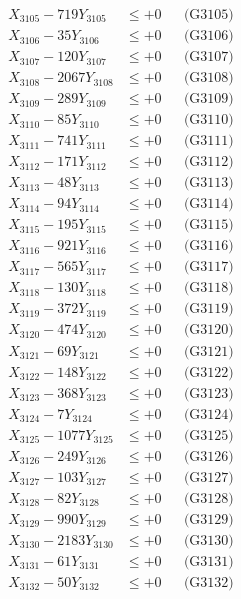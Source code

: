 \documentclass[a4paper,10pt]{article}
\begin{document}
{\begin{align}
X_{3105} - 719Y_{3105} &\leq +0 && \text{(G3105)} \\
X_{3106} - 35Y_{3106} &\leq +0 && \text{(G3106)} \\
X_{3107} - 120Y_{3107} &\leq +0 && \text{(G3107)} \\
X_{3108} - 2067Y_{3108} &\leq +0 && \text{(G3108)} \\
X_{3109} - 289Y_{3109} &\leq +0 && \text{(G3109)} \\
X_{3110} - 85Y_{3110} &\leq +0 && \text{(G3110)} \\
\allowbreak
X_{3111} - 741Y_{3111} &\leq +0 && \text{(G3111)} \\
X_{3112} - 171Y_{3112} &\leq +0 && \text{(G3112)} \\
X_{3113} - 48Y_{3113} &\leq +0 && \text{(G3113)} \\
X_{3114} - 94Y_{3114} &\leq +0 && \text{(G3114)} \\
X_{3115} - 195Y_{3115} &\leq +0 && \text{(G3115)} \\
X_{3116} - 921Y_{3116} &\leq +0 && \text{(G3116)} \\
X_{3117} - 565Y_{3117} &\leq +0 && \text{(G3117)} \\
X_{3118} - 130Y_{3118} &\leq +0 && \text{(G3118)} \\
X_{3119} - 372Y_{3119} &\leq +0 && \text{(G3119)} \\
X_{3120} - 474Y_{3120} &\leq +0 && \text{(G3120)} \\
\allowbreak
X_{3121} - 69Y_{3121} &\leq +0 && \text{(G3121)} \\
X_{3122} - 148Y_{3122} &\leq +0 && \text{(G3122)} \\
X_{3123} - 368Y_{3123} &\leq +0 && \text{(G3123)} \\
X_{3124} - 7Y_{3124} &\leq +0 && \text{(G3124)} \\
X_{3125} - 1077Y_{3125} &\leq +0 && \text{(G3125)} \\
X_{3126} - 249Y_{3126} &\leq +0 && \text{(G3126)} \\
X_{3127} - 103Y_{3127} &\leq +0 && \text{(G3127)} \\
X_{3128} - 82Y_{3128} &\leq +0 && \text{(G3128)} \\
X_{3129} - 990Y_{3129} &\leq +0 && \text{(G3129)} \\
X_{3130} - 2183Y_{3130} &\leq +0 && \text{(G3130)} \\
\allowbreak
X_{3131} - 61Y_{3131} &\leq +0 && \text{(G3131)} \\
X_{3132} - 50Y_{3132} &\leq +0 && \text{(G3132)} \\

\end{align}}
\end{document}
